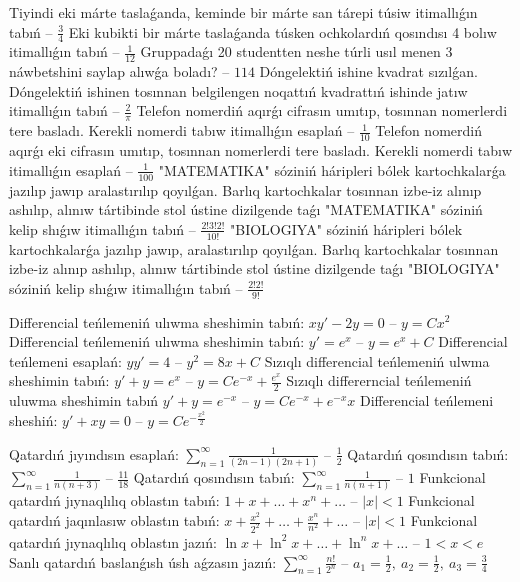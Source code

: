 Tiyindi eki márte taslaǵanda, keminde bir márte san tárepi túsiw itimallıǵın tabıń -- $\frac{3}{4}$
Eki kubikti bir márte taslaǵanda túsken ochkolardıń qosındısı 4 bolıw itimallıǵın tabıń -- $\frac{1}{12}$
Gruppadaǵı 20 studentten neshe túrli usıl menen 3 náwbetshini saylap alıwǵa boladı? -- $114$
Dóngelektiń ishine kvadrat sızılǵan. Dóngelektiń ishinen tosınnan belgilengen noqattıń kvadrattıń ishinde jatıw itimallıǵın tabıń -- $\frac{2}{\pi}$
Telefon nomerdiń aqırǵı cifrasın umıtıp, tosınnan nomerlerdi tere basladı. Kerekli nomerdi tabıw itimallıǵın esaplań -- $\frac{1}{10}$
Telefon nomerdiń aqırǵı eki cifrasın umıtıp, tosınnan nomerlerdi tere basladı. Kerekli nomerdi tabıw itimallıǵın esaplań -- $\frac{1}{100}$
"MATEMATIKA" sóziniń háripleri bólek kartochkalarǵa jazılıp jawıp aralastırılıp qoyılǵan. Barlıq kartochkalar tosınnan izbe-iz alınıp ashılıp, alınıw tártibinde stol ústine dizilgende taǵı "MATEMATIKA" sóziniń kelip shıǵıw itimallıǵın tabıń -- $\frac{2!3!2!}{10!}$
"BIOLOGIYA" sóziniń háripleri bólek kartochkalarǵa jazılıp jawıp, aralastırılıp qoyılǵan. Barlıq kartochkalar tosınnan izbe-iz alınıp ashılıp, alınıw tártibinde stol ústine dizilgende taǵı "BIOLOGIYA" sóziniń kelip shıǵıw itimallıǵın tabıń -- $\frac{2!2!}{9!}$

Differencial teńlemeniń ulıwma sheshimin tabıń: $xy' - 2y = 0$ -- $y=Cx^2$
Differencial teńlemeniń ulıwma sheshimin tabıń: $y'=e^{x}$ -- $y=e^x+C$
Differencial teńlemeni esaplań: $yy'= 4$ -- $y^2=8x+C$
Sızıqlı differencial teńlemeniń ulwma sheshimin tabıń: $y' + y =e^{x}$ -- $y=Ce^{-x}+\frac{e^x}{2}$
Sızıqlı differerncial teńlemeniń uluwma sheshimin tabıń $y' + y =e^{-x}$ -- $y=Ce^{-x}+e^{-x}x$
Differencial teńlemeni sheshiń: $y' + xy = 0$ -- $y=Ce^{-\frac{x^2}{2}}$

Qatardıń jıyındısın esaplań: $\displaystyle\sum_{n = 1}^{\infty}\frac{1}{(2n - 1)(2n + 1)}$ -- $\frac{1}{2}$
Qatardıń qosındısın tabıń: $\displaystyle\sum_{n = 1}^{\infty}\frac{1}{n(n + 3)}$ -- $\frac{11}{18}$
Qatardıń qosındısın tabıń: $\displaystyle\sum_{n = 1}^{\infty}\frac{1}{n(n + 1)}$ -- $1$
Funkcional qatardıń jıynaqlılıq oblastın tabıń: $1 + x + \ldots + x^{n} + \ldots$ -- $|x|<1$
Funkcional qatardıń jaqınlasıw oblastın tabıń: $\displaystyle x + \frac{x^{2}}{2^{2}} + \ldots + \frac{x^{n}}{n^{2}} + \ldots$ -- $|x|<1$
Funkcional qatardıń jıynaqlılıq oblastın jazıń: $\ln x + \ln^{2}x + \ldots + \ln^{n}x + \ldots$ -- $1\lt x\lt e$
Sanlı qatardıń baslanǵısh úsh aǵzasın jazıń: $\displaystyle\sum_{n = 1}^{\infty}\frac{n!}{2^{n}}$ -- $a_1=\frac{1}{2},\ a_2=\frac{1}{2},\ a_3=\frac{3}{4}$
